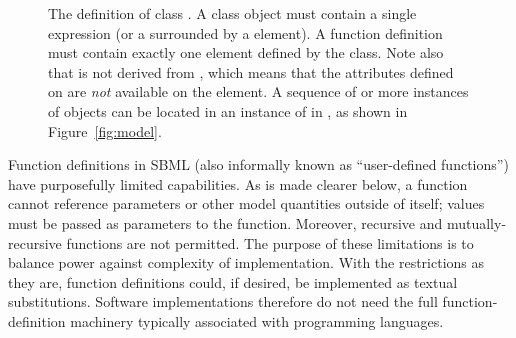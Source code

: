 \begin{figure}[htb]
  \centering
  \small
  \vspace*{-0.75ex}
  \vspace*{-2ex}
  \caption{The definition of class \FunctionDefinition.  A
     class object must contain a single \mathml
     expression (or a  surrounded by a
     element).  A function definition must
    contain exactly one  element defined by the
     class.  Note also that  is not
    derived from \SBaseUpright, which means that the attributes defined
    on \SBaseUpright are \emph{not} available on the 
    element.  A sequence of  or more instances of
    \FunctionDefinition objects can be located in an instance of
    \ListOfFunctionDefinitions in \Model, as shown in
    Figure~\protect\ref{fig:model}.}
  \label{fig:mathdefinition}
  \label{fig:functionDefinition}
\end{figure}

Function definitions in SBML (also informally known as
``user-defined functions'') have purposefully limited capabilities.
As is made clearer below, a function cannot reference
parameters or other model quantities outside of itself; values
must be passed as parameters to the function.  Moreover, recursive
and mutually-recursive functions are not permitted.  The purpose
of these limitations is to balance power against complexity of
implementation.  With the restrictions as they are, function
definitions could, if desired, be implemented as textual substitutions.
Software implementations therefore do not need
the full function-definition machinery typically associated with
programming languages.

